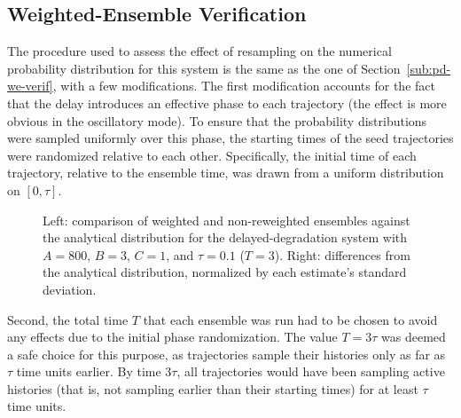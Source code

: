 \documentclass[english,letterpaper,12pt]{report}
\begin{document}
\begin{doublespacing}
\subsection{Weighted-Ensemble Verification} %
\label{sub:dd-we-verif}

The procedure used to assess the effect of resampling on the numerical probability distribution for this system is the same as the one of Section~\ref{sub:pd-we-verif}, with a few modifications. The first modification accounts for the fact that the delay introduces an effective phase to each trajectory (the effect is more obvious in the oscillatory mode). To ensure that the probability distributions were sampled uniformly over this phase, the starting times of the seed trajectories were randomized relative to each other. Specifically, the initial time of each trajectory, relative to the ensemble time, was drawn from a uniform distribution on $[0, \tau]$.

\begin{figure}[tbp]
    \makebox[\linewidth][c]{
        \begin{subfigure}{3in}
            \begin{center}
                
            \end{center}
            \label{sfg:ddwe0-comp}
        \end{subfigure}
        \begin{subfigure}{3in}
            \begin{center}
                
            \end{center}
            \label{sfg:ddwe0-chi}
        \end{subfigure}
    }
    \caption{Left: comparison of weighted and non-reweighted ensembles against the analytical distribution for the delayed-degradation system with $A=800$, $B=3$, $C=1$, and $\tau=0.1$ ($T=3$). Right: differences from the analytical distribution, normalized by each estimate's standard deviation.}
    \label{fig:ddwe0}
\end{figure}

Second, the total time $T$ that each ensemble was run had to be chosen to avoid any effects due to the initial phase randomization. The value $T = 3\tau$ was deemed a safe choice for this purpose, as trajectories sample their histories only as far as $\tau$ time units earlier. By time $3\tau$, all trajectories would have been sampling active histories (that is, not sampling earlier than their starting times) for at least $\tau$ time units.


\end{doublespacing}
\end{document}
